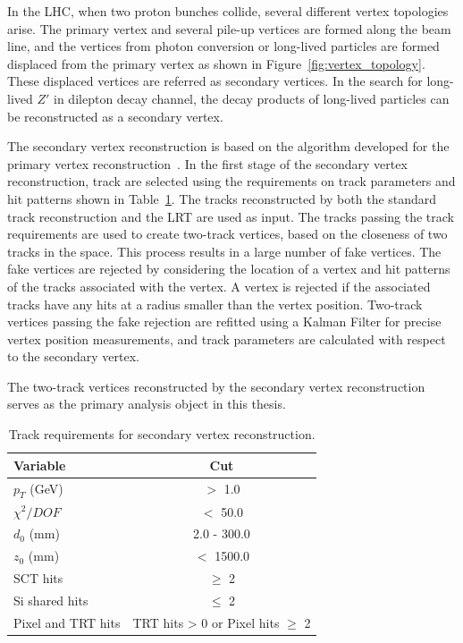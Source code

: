 In the LHC, when two proton bunches collide, several different vertex topologies arise. The primary vertex and several pile-up vertices are formed along the beam line, and the vertices from photon conversion or long-lived particles are formed displaced from the primary vertex as shown in Figure~\ref{fig:vertex_topology}. These displaced vertices are referred as secondary vertices. In the search for long-lived $Z'$ in dilepton decay channel, the decay products of long-lived particles can be reconstructed as a secondary vertex.

The secondary vertex reconstruction is based on the algorithm developed for the primary vertex reconstruction~\cite{1742-6596-119-3-032033}. In the first stage of the secondary vertex reconstruction, track are selected using the requirements on track parameters and hit patterns shown in Table~\ref{table:vertex_track_selection_simple}. The tracks reconstructed by both the standard track reconstruction and the LRT are used as input. The tracks passing the track requirements are used to create two-track vertices, based on the closeness of two tracks in the space. This process results in a large number of fake vertices. The fake vertices are rejected by considering the location of a vertex and hit patterns of the tracks associated with the vertex. A vertex is rejected if the associated tracks have any hits at a radius smaller than the vertex position. Two-track vertices passing the fake rejection are refitted using a Kalman Filter for precise vertex position measurements, and track parameters are calculated with respect to the secondary vertex.

The two-track vertices reconstructed by the secondary vertex reconstruction serves as the primary analysis object in this thesis. 


\begin{table}[!htb]
  \centering
  \begin{tabular}{ l c }
    \hline
    \hline
	Variable      		& Cut                                         	\\
    \hline
	$p_{T}$ (GeV)		& $>$ 1.0										\\
	$\chi^{2} / DOF$	& $<$ 50.0										\\
	$d_{0}$	(mm)		& 2.0 - 300.0									\\
	$z_{0}$ (mm)		& $<$ 1500.0									\\
	SCT hits			& $\geq$ 2										\\
	Si shared hits	    & $\leq$ 2										\\
	Pixel and TRT hits  & TRT hits > 0 or Pixel hits $\geq$ 2			\\
    \hline
    \hline
  \end{tabular}
  \caption{Track requirements for secondary vertex reconstruction.}
  \label{table:vertex_track_selection_simple}
\end{table}


